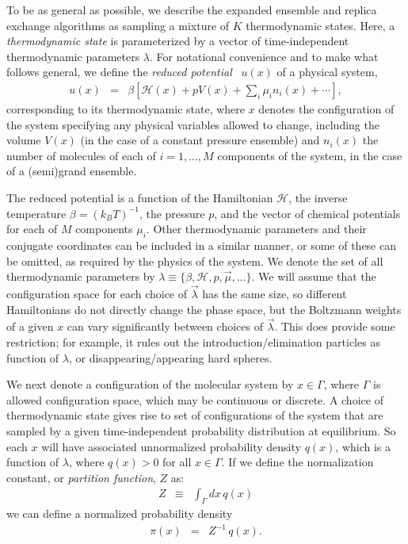 \documentclass[superscriptaddress,showkeys, nofootinbib, pre, aps]{revtex4-1}
\begin{document}
To be as general as possible, we describe the expanded ensemble and replica exchange algorithms as sampling a mixture of $K$ thermodynamic
states.  Here, a \emph{thermodynamic state} is parameterized by a vector of time-independent thermodynamic parameters $\lambda$.  For
notational convenience and to make what follows general, we define the
\emph{reduced potential}~\cite{shirts-chodera:jcp:2008:mbar} $u(x)$ of
a physical system,
\begin{eqnarray}
u(x) &=& \beta \left[ \mathcal{H}(x) + p V(x) + \sum_i\mu_i n_i(x) + \cdots \right], \label{equation:reduced-potential}
\end{eqnarray}
corresponding to its thermodynamic state, where $x$ denotes the
configuration of the system specifying any physical variables allowed
to change, including the volume $V(x)$ (in the case of a constant
pressure ensemble) and $n_i(x)$ the number of molecules of each of
$i=1,\ldots,M$ components of the system, in the case of a (semi)grand
ensemble.

The reduced potential is a function of the Hamiltonian $\mathcal{H}$, the
inverse temperature $\beta = (k_B T)^{-1}$, the pressure $p$, and the
vector of chemical potentials for each of $M$ components $\mu_i$.
Other thermodynamic parameters and their conjugate coordinates can be
included in a similar manner, or some of these can be omitted, as
required by the physics of the system.  We denote the set of all
thermodynamic parameters by $\lambda \equiv \{\beta, \mathcal{H}, p, \vec{\mu},
\ldots\}$. We will assume that the configuration space for each choice of $\vec{\lambda}$ has the same size, so different Hamiltonians do not directly change the phase space, but the Boltzmann weights of a given $x$ can vary significantly between choices of $\vec{\lambda}$. This does provide some restriction; for example, it rules out the introduction/elimination particles as function of $\lambda$, or disappearing/appearing hard spheres.

We next denote a configuration of the molecular system by $x \in
\Gamma$, where $\Gamma$ is allowed configuration space, which may be
continuous or discrete.  A choice of thermodynamic state gives rise to
set of configurations of the system that are sampled by a given
time-independent probability distribution at equilibrium.  So each $x$
will have associated unnormalized probability density $q(x)$, which is
a function of $\lambda$, where $q(x) > 0$ for all $x \in \Gamma$. If
we define the normalization constant, or \emph{partition function},
$Z$ as:
\begin{eqnarray}
Z &\equiv& \int_\Gamma dx \, q(x)
\end{eqnarray}
we can define a normalized probability density
\begin{eqnarray}
\pi(x) &=& Z^{-1} \, q(x).
\end{eqnarray}
\end{document}

